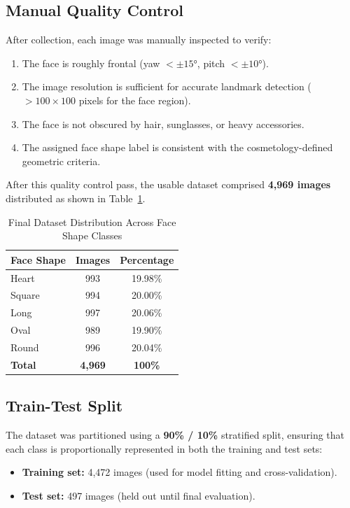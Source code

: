 \subsection{Manual Quality Control}
After collection, each image was manually inspected to verify:
\begin{enumerate}
    \item The face is roughly frontal (yaw $< \pm 15°$, pitch $< \pm 10°$).
    \item The image resolution is sufficient for accurate landmark detection ($> 100 \times 100$ pixels for the face region).
    \item The face is not obscured by hair, sunglasses, or heavy accessories.
    \item The assigned face shape label is consistent with the cosmetology-defined geometric criteria.
\end{enumerate}
After this quality control pass, the usable dataset comprised \textbf{4,969 images} distributed as shown in Table~\ref{tab:dataset_dist}.

\begin{table}[H]
\centering
\caption{Final Dataset Distribution Across Face Shape Classes}
\label{tab:dataset_dist}
\begin{tabular}{lcc}
\toprule
\textbf{Face Shape} & \textbf{Images} & \textbf{Percentage} \\
\midrule
Heart  & 993  & 19.98\% \\
Square & 994  & 20.00\% \\
Long   & 997  & 20.06\% \\
Oval   & 989  & 19.90\% \\
Round  & 996  & 20.04\% \\
\midrule
\textbf{Total} & \textbf{4,969} & \textbf{100\%} \\
\bottomrule
\end{tabular}
\end{table}

\subsection{Train-Test Split}
The dataset was partitioned using a \textbf{90\% / 10\%} stratified split, ensuring that each class is proportionally represented in both the training and test sets:
\begin{itemize}
    \item \textbf{Training set:} 4,472 images (used for model fitting and cross-validation).
    \item \textbf{Test set:} 497 images (held out until final evaluation).
\end{itemize}

